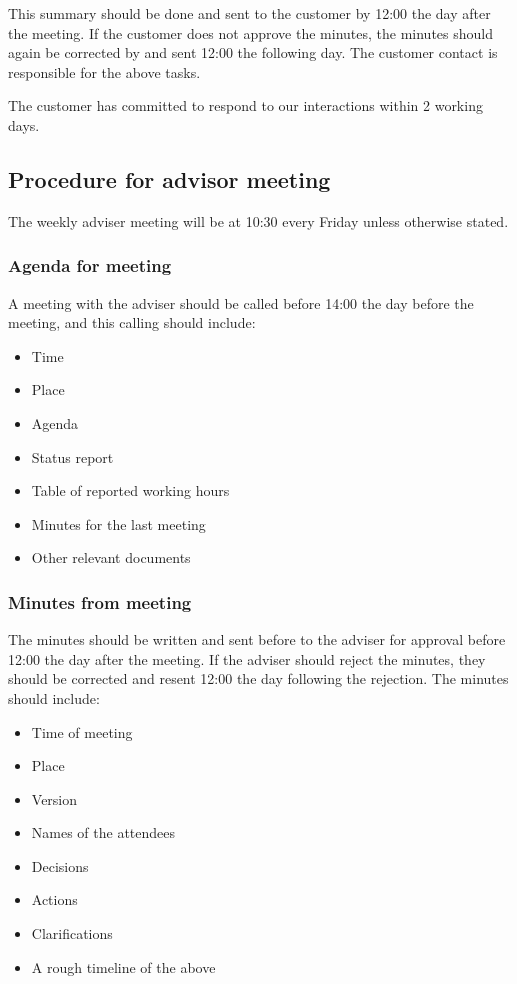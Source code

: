 This summary should be done and sent to the customer by 12:00 the day after the meeting. If the customer does not approve the minutes, the minutes should again be corrected by and sent 12:00 the following day. The customer contact is responsible for the above tasks.

The customer has committed to respond to our interactions within 2 working days.

\subsection{Procedure for advisor meeting}
The weekly adviser meeting will be at 10:30 every Friday unless otherwise stated.

\subsubsection{Agenda for meeting}
A meeting with the adviser should be called before 14:00 the day before the meeting, and this calling should include:
\begin{itemize}
	\item Time
	\item Place
	\item Agenda
	\item Status report
	\item Table of reported working hours
	\item Minutes for the last meeting
	\item Other relevant documents
\end{itemize}

\subsubsection{Minutes from meeting}
The minutes should be written and sent before to the adviser for approval before 12:00 the day after the meeting. If the adviser should reject the minutes, they should be corrected and resent 12:00 the day following the rejection. The minutes should include:
\begin{itemize}
	\item Time of meeting
	\item Place
	\item Version
	\item Names of the attendees
	\item Decisions
	\item Actions
	\item Clarifications
	\item A rough timeline of the above
\end{itemize}

